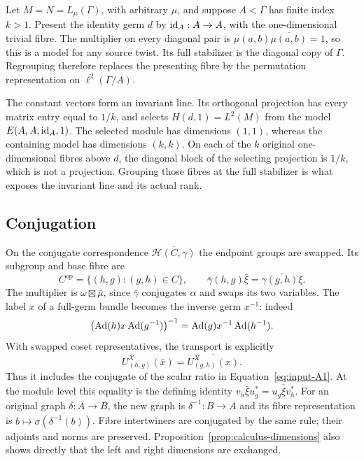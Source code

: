 \begin{remark}
Let $M=N=L_\mu(\Gamma)$, with arbitrary $\mu$, and suppose
$A<\Gamma$ has finite index $k>1$.  Present the identity germ $d$
by $\operatorname{id}_A:A\to A$, with the one-dimensional trivial fibre.
The multiplier on every diagonal pair is
$\mu(a,b)\overline{\mu(a,b)}=1$, so this is a model for any source
twist.  Its full stabilizer is the diagonal copy of $\Gamma$.
Regrouping therefore replaces the presenting fibre by the permutation
representation on $\ell^2(\Gamma/A)$.

The constant vectors form an invariant line.  Its orthogonal projection
has every matrix entry equal to $1/k$, and selects
$H(d,1)=L^2(M)$ from the model $E(A,A,\operatorname{id}_A,1)$.
The selected module has dimensions $(1,1)$, whereas the containing model
has dimensions $(k,k)$.  On each of the $k$ original one-dimensional
fibres above $d$, the diagonal block of the selecting projection is $1/k$, which
is not a projection.  Grouping those fibres at the full stabilizer is
what exposes the invariant line and its actual rank.
\end{remark}

\subsection{Conjugation}

On the conjugate correspondence $\overline{\mathcal H(C,\gamma)}$
the endpoint groups are swapped.  Its subgroup and base fibre are
\[
 C^{\mathrm{op}}=\{(h,g):(g,h)\in C\},\qquad
 \bar\gamma(h,g)\bar\xi=\overline{\gamma(g,h)\xi}.
\]
The multiplier is
$\omega\boxtimes\bar\mu$, since
$\bar\gamma$ conjugates $\alpha$ and swaps its two variables.
The label $x$ of a full-germ bundle becomes the inverse germ $x^{-1}$:
indeed
\[
 \bigl(\operatorname{Ad}(h)x\operatorname{Ad}(g^{-1})\bigr)^{-1}
 =\operatorname{Ad}(g)x^{-1}\operatorname{Ad}(h^{-1}).
\]
With swapped coset representatives, the transport is explicitly
\begin{equation}\label{eq:calculus-conjugate-transport}
 U^{\bar X}_{(h,g)}(\bar x)
   =\overline{U^X_{(g,h)}(x)}.
\end{equation}
Thus it includes the conjugate of the scalar ratio in
Equation~\eqref{eq:input-A1}.  At the module level this equality is
the defining identity
$v_h\bar\xi u_g^*=\overline{u_g\xi v_h^*}$.
For an original graph $\delta:A\to B$, the new graph is
$\delta^{-1}:B\to A$ and its fibre representation is
$b\mapsto\overline{\sigma(\delta^{-1}(b))}$.
Fibre intertwiners are conjugated by the same rule; their adjoints and
norms are preserved.  Proposition~\ref{prop:calculus-dimensions}
also shows directly that the left and right dimensions are exchanged.

